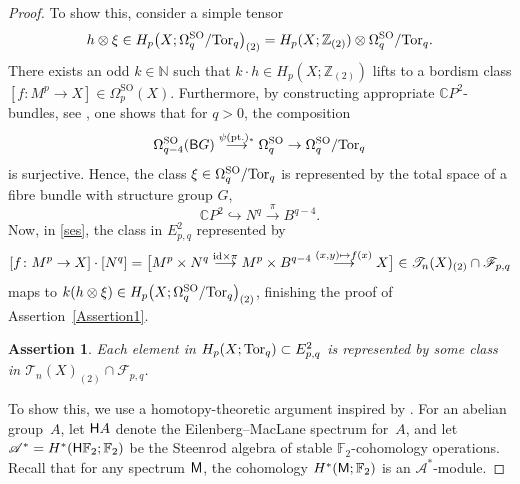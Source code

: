 \documentclass[pdftex]{sigma}
\numberwithin{equation}{section}
\newtheorem{Assertion}[Theorem]{Assertion}
\newcommand{\F}{\mathbb{F}}
\newcommand{\Z}{\mathbb{Z}}
\newcommand{\C}{\mathbb{C}}
\newcommand{\N}{\mathbb{N}}
\newcommand{\SO}{\mathrm{SO}}
\newcommand{\id}{{\rm id}}
\newcommand{\sB}{{\sf B}}
\newcommand{\Tor}{{\rm Tor}}
\begin{document}
\begin{proof}
To show this, consider a simple tensor
\[
 h \otimes \xi \in H_p\big(X; \Omega_q^{\SO} / \Tor_q \big)_{(2)} = H_p(X; \Z_{(2)}) \otimes \Omega_q^{\SO} / \Tor_q .
\]
There exists an odd $k \in \N$ such that $k\cdot h \in H_p(X; \Z_{(2)})$ lifts to a bordism class $ [ f \colon M^p \to X] \in \Omega_p^{\SO}(X)$.
Furthermore, by constructing appropriate $\C P^2$-bundles, see \cite[Proposition 8.2]{Fuehring_bordism}, one shows that for $q > 0$, the composition
\[
 \Omega^{\SO}_{q-4} (\sB G) \stackrel{\psi({\rm pt.})_*}{\longrightarrow} \Omega^{\SO}_{q} \to \Omega^{\SO}_q/ \Tor_q
\]
is surjective.
Hence, the class $\xi \in \Omega_q^{\SO} / \Tor_q$ is represented by the total space of a fibre bundle with structure group $G$,
\[
 \C P^2 \hookrightarrow N^q \stackrel{\pi}{\longrightarrow} B^{q-4}.
 \]
Now, in \eqref{ses}, the class in $E^2_{p,q}$ represented by
\[
 [ f \colon M^p \to X] \cdot [N^q] = \big[M^p \times N^q \stackrel{\id \times \pi}{\longrightarrow} M^p \times B^{q-4} \stackrel{(x,y) \mapsto f(x)}{\longrightarrow} X\big] \in \mathscr{T}_n(X)_{(2)} \cap \mathscr{F}_{p,q}
\]
maps to $k ( h \otimes \xi) \in H_p\big(X; \Omega^{\SO}_q / \Tor_q \big)_{(2)}$, finishing the proof of Assertion~\ref{Assertion1}.


\begin{Assertion}\label{Assertion2}
 Each element in $H_p(X; \Tor_q) \subset E^2_{p,q}$ is represented by some class in $\mathscr{T}_n(X)_{(2)} \cap \mathscr{F}_{p,q}$.
\end{Assertion}


To show this, we use a homotopy-theoretic argument inspired by \cite{Stolz_splitting}.
For an abelian group~$A$, let ${\sf H}A$ denote the Eilenberg--MacLane spectrum for~$A$, and let $\mathscr{A}^*=H^*({\sf H}\F_2; \F_2)$ be the Steenrod algebra of stable $\F_2$-cohomology operations.
Recall that for any spectrum ${\sf M}$, the cohomology $H^*({\sf M}; \F_2)$ is an $\mathscr{A}^*$-module.


\end{proof}
\end{document}
